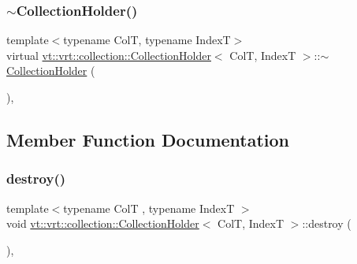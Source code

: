 \mbox{\label{structvt_1_1vrt_1_1collection_1_1_collection_holder_a80360d38dc40e4bf2253288b01595de6}} 
\subsubsection{\texorpdfstring{$\sim$\+Collection\+Holder()}{~CollectionHolder()}}
{\footnotesize\ttfamily template$<$typename ColT, typename IndexT$>$ \\
virtual \hyperlink{structvt_1_1vrt_1_1collection_1_1_collection_holder}{vt\+::vrt\+::collection\+::\+Collection\+Holder}$<$ ColT, IndexT $>$\+::$\sim$\hyperlink{structvt_1_1vrt_1_1collection_1_1_collection_holder}{Collection\+Holder} (\begin{DoxyParamCaption}{ }\end{DoxyParamCaption})\hspace{0.3cm}{\ttfamily [inline]}, {\ttfamily [virtual]}}



\subsection{Member Function Documentation}
\mbox{\label{structvt_1_1vrt_1_1collection_1_1_collection_holder_a744d2a48f9f22db59b2705b3d3f3d1ca}} 
\subsubsection{\texorpdfstring{destroy()}{destroy()}}
{\footnotesize\ttfamily template$<$typename ColT , typename IndexT $>$ \\
void \hyperlink{structvt_1_1vrt_1_1collection_1_1_collection_holder}{vt\+::vrt\+::collection\+::\+Collection\+Holder}$<$ ColT, IndexT $>$\+::destroy (\begin{DoxyParamCaption}{ }\end{DoxyParamCaption})\hspace{0.3cm}{\ttfamily [override]}, {\ttfamily [virtual]}}



